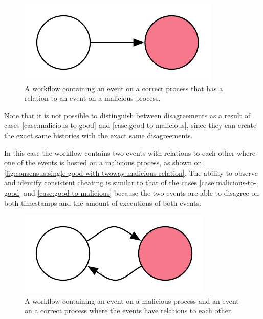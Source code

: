 	\begin{figure}[H]
		\centering
		\includegraphics{6validation/images/2.pdf}
		\caption{A workflow containing an event on a correct process that has a relation to an event on a malicious process.}
		\label{fig:consensus:single-good-with-malicious-relation}
	\end{figure}

	\noindent Note that it is not possible to distinguish between disagreements as a result of cases \ref{case:malicious-to-good} and \ref{case:good-to-malicious}, since they can create the exact same histories with the exact same disagreements.
	
	\begin{case}
		In this case the workflow contains two events with relations to each other where one of the events is hosted on a malicious process, as shown on \autoref{fig:consensus:single-good-with-twoway-malicious-relation}. The ability to observe and identify consistent cheating is similar to that of the cases \ref{case:malicious-to-good} and \ref{case:good-to-malicious} because the two events are able to disagree on both timestamps and the amount of executions of both events.
	\end{case}
	
	\begin{figure}[H]
		\centering
		\includegraphics{6validation/images/6.pdf}
		\caption{A workflow containing an event on a malicious process and an event on a correct process where the events have relations to each other.}
		\label{fig:consensus:single-good-with-twoway-malicious-relation}
	\end{figure}
	

